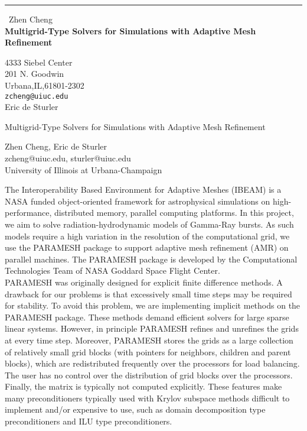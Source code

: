 \documentclass{report}
\begin{document}
\begin{center}
\rule{6in}{1pt} \
{\large Zhen Cheng \\
{\bf Multigrid-Type Solvers for Simulations with Adaptive Mesh Refinement}}

4333 Siebel Center \\ 201 N. Goodwin \\ Urbana,IL,61801-2302
\\
{\tt zcheng@uiuc.edu}\\
Eric de Sturler\end{center}

\begin{center}
Multigrid-Type Solvers for Simulations with Adaptive Mesh Refinement\\

\bigskip

Zhen Cheng, Eric de Sturler\\
zcheng@uiuc.edu, sturler@uiuc.edu\\
University of Illinois at Urbana-Champaign\\
\end{center}
\bigskip

The Interoperability Based Environment for Adaptive Meshes (IBEAM) is a
NASA funded object-oriented framework for astrophysical simulations on
high-performance, distributed memory, parallel computing platforms. In
this project, we aim to solve radiation-hydrodynamic models of Gamma-Ray
bursts. As such models require a high variation in the resolution of the
computational grid, we use the PARAMESH package to support adaptive mesh
refinement (AMR) on parallel machines. The PARAMESH package is developed
by the Computational Technologies
Team of NASA Goddard Space Flight Center.\\

PARAMESH was originally designed for explicit finite difference
methods. A drawback for our problems is that excessively small
time steps may be required for stability. To avoid this problem,
we are implementing implicit methods on the PARAMESH package.
These methods demand efficient solvers for large sparse linear
systems. However, in principle PARAMESH refines and unrefines the grids
at every time step. Moreover, PARAMESH stores the grids as a large
collection of relatively small grid blocks (with pointers for neighbors,
children and parent blocks), which are redistributed frequently over the
processors for load balancing. The user has no control over the
distribution of grid blocks over the processors. Finally, the matrix is
typically not computed explicitly. These features make many
preconditioners typically used with Krylov subspace methods difficult to
implement and/or expensive to use, such as domain decomposition type
preconditioners and ILU type preconditioners.\\
\end{document}

